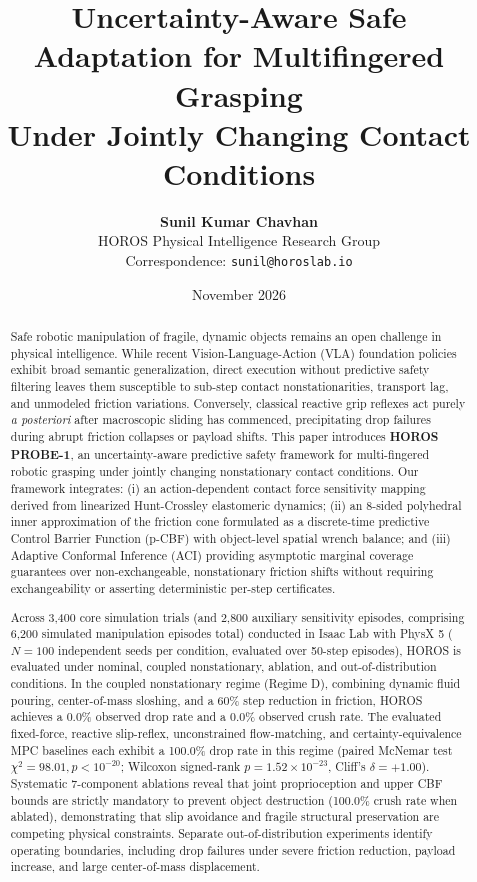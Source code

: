 \documentclass[11pt,a4paper]{article}
\title{Uncertainty-Aware Safe Adaptation for Multifingered Grasping\\Under Jointly Changing Contact Conditions}
\author{
  \textbf{Sunil Kumar Chavhan}\\[0.5em]
  \small HOROS Physical Intelligence Research Group\\
  \small Correspondence: \texttt{sunil@horoslab.io}
}
\date{November 2026}
\begin{document}
\maketitle

\begin{abstract}
Safe robotic manipulation of fragile, dynamic objects remains an open challenge in physical intelligence. While recent Vision-Language-Action (VLA) foundation policies exhibit broad semantic generalization, direct execution without predictive safety filtering leaves them susceptible to sub-step contact nonstationarities, transport lag, and unmodeled friction variations. Conversely, classical reactive grip reflexes act purely \emph{a posteriori} after macroscopic sliding has commenced, precipitating drop failures during abrupt friction collapses or payload shifts. This paper introduces \textbf{HOROS PROBE-1}, an uncertainty-aware predictive safety framework for multi-fingered robotic grasping under jointly changing nonstationary contact conditions. Our framework integrates: (i) an action-dependent contact force sensitivity mapping derived from linearized Hunt-Crossley elastomeric dynamics; (ii) an 8-sided polyhedral inner approximation of the friction cone formulated as a discrete-time predictive Control Barrier Function (p-CBF) with object-level spatial wrench balance; and (iii) Adaptive Conformal Inference (ACI) providing asymptotic marginal coverage guarantees over non-exchangeable, nonstationary friction shifts without requiring exchangeability or asserting deterministic per-step certificates.

Across 3,400 core simulation trials (and 2,800 auxiliary sensitivity episodes, comprising 6,200 simulated manipulation episodes total) conducted in Isaac Lab with PhysX 5 ($N = 100$ independent seeds per condition, evaluated over 50-step episodes), HOROS is evaluated under nominal, coupled nonstationary, ablation, and out-of-distribution conditions. In the coupled nonstationary regime (Regime D), combining dynamic fluid pouring, center-of-mass sloshing, and a 60\% step reduction in friction, HOROS achieves a 0.0\% observed drop rate and a 0.0\% observed crush rate. The evaluated fixed-force, reactive slip-reflex, unconstrained flow-matching, and certainty-equivalence MPC baselines each exhibit a 100.0\% drop rate in this regime (paired McNemar test $\chi^2 = 98.01, p < 10^{-20}$; Wilcoxon signed-rank $p = 1.52 \times 10^{-23}$, Cliff's $\delta = +1.00$). Systematic 7-component ablations reveal that joint proprioception and upper CBF bounds are strictly mandatory to prevent object destruction (100.0\% crush rate when ablated), demonstrating that slip avoidance and fragile structural preservation are competing physical constraints. Separate out-of-distribution experiments identify operating boundaries, including drop failures under severe friction reduction, payload increase, and large center-of-mass displacement.


\end{abstract}
\end{document}
